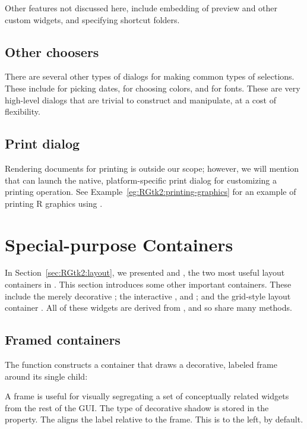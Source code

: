 Other features not discussed here, include embedding of preview and
other custom widgets, and specifying shortcut folders.

\subsection{Other choosers}

There are several other types of dialogs for making common types of
selections. These include  for picking dates,
 for choosing colors, and
 for fonts. These are very high-level
dialogs that are trivial to construct and manipulate, at a cost of
flexibility.

\subsection{Print dialog}

Rendering documents for printing is outside our scope; however, we
will mention that  can launch the native,
platform-specific print dialog for customizing a printing
operation. See Example~\ref{eg:RGtk2:printing-graphics} for an example
of printing R graphics using .


\section{Special-purpose Containers}
\label{sec:containers}

In Section~\ref{sec:RGtk2:layout}, we presented  and
, the two most useful layout containers in
\GTK. This section introduces some other important containers. These
include the merely decorative ; the interactive
,  and ; and the
grid-style layout container . All of these widgets are
derived from , and so share many methods.

\subsection{Framed containers}
\label{sec:RGtk2:gtkFrame}

The  function constructs a container that draws
a decorative, labeled frame around its single child:
\begin{Schunk}
\end{Schunk}
%
A frame is useful for visually segregating a set of conceptually
related widgets from the rest of the GUI. The type of decorative
shadow is stored in the  property.  The
 aligns the label relative to the
frame. This is to the left, by default.

